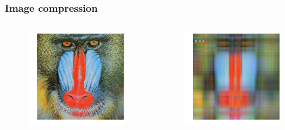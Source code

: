 \documentclass[xcolor={dvipsnames}]{beamer}
\begin{document}
\begin{frame}
\frametitle{Image compression}
\begin{columns}
\hspace{-0.25in}
\begin{figure}
\includegraphics[width=\textwidth]{figs/mandrill.png}
\end{figure}
\begin{figure}
\includegraphics[width=\textwidth]{figs/mandrill-3.png}
\end{figure}
\end{columns}
\end{frame}
\end{document}
